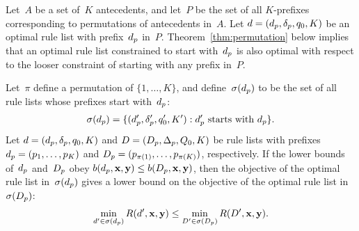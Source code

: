 Let~$A$ be a set of~$K$ antecedents, and let~$P$ be the set of all
$K$-prefixes corresponding to permutations of antecedents in~$A$.
%
Let ${{d} = (d_p, \delta_p, q_0, K)}$ be an optimal rule list
with prefix~$d_p$ in~$P$.
%
Theorem~\ref{thm:permutation} below implies that
an optimal rule list constrained to start with~$d_p$
is also optimal with respect to the looser constraint of
starting with any prefix in~$P$.

\begin{theorem}
\label{thm:permutation}
Let~$\pi$ define a permutation of ${\{1, \dots, K\}}$,
and define~$\sigma(d_p)$ to be the set of all rule lists
whose prefixes start with~$d_p$:
\begin{align}
\StartsWith(\Prefix) =
\{(\Prefix', \Labels', \Default', K') : \Prefix' \textnormal{ starts with } \Prefix \}.
\end{align}
Let ${{d} = (d_p, \delta_p, q_0, K)}$
and ${{D} = (D_p, \Delta_p, Q_0, K)}$
be rule lists with prefixes ${d_p = (p_1, \dots, p_K)}$
and ${D_p = (p_{\pi(1)}, \dots, p_{\pi(K)})}$, respectively.
%
If the lower bounds of~$d_p$ and~$D_p$
obey ${b(d_p, \mathbf{x}, \mathbf{y}) \le b(D_p, \mathbf{x}, \mathbf{y})}$,
then the objective of the optimal rule list in~$\sigma(d_p)$ gives a
lower bound on the objective of the optimal rule list in~$\sigma(D_p)$:
\begin{align}
\min_{\RL' \in \StartsWith(\Prefix)} \Obj(\RL', \x, \y)
\le \min_{\RLB' \in \StartsWith(\PrefixB)} \Obj(\RLB', \x, \y).
\label{eq:permutation}
\end{align}
\end{theorem}

